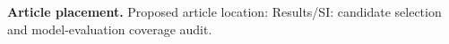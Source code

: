 \textbf{Article placement.} Proposed article location: Results/SI: candidate selection and model-evaluation coverage audit.

